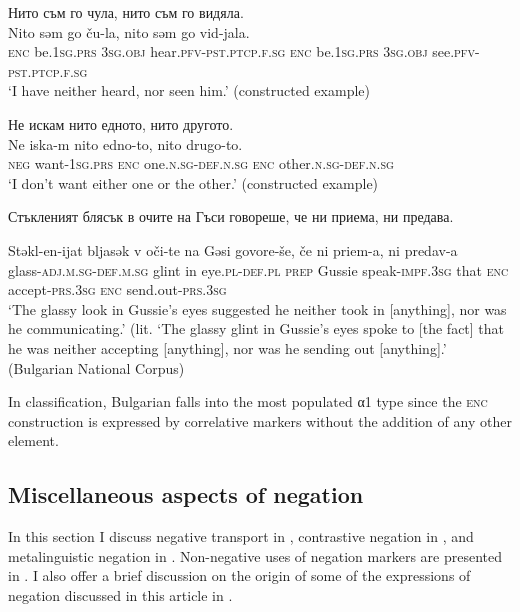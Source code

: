 \documentclass[output=paper,colorlinks=true, citecolor=brown]{langscibook}
\begin{document}

\ea \label{ex:bul:coord-1}
\ea Нито съм го чула, нито съм го видяла.\\ \label{ex:bul:coord-1a}
  	\gll Nito səm go ču-la, nito səm go vid-jala.\\
     \textsc{enc} be.\textsc{1sg.prs} \textsc{3sg.obj} hear.\textsc{pfv}-\textsc{pst.ptcp.f.sg} \textsc{enc} be.\textsc{1sg.prs} \textsc{3sg.obj} see.\textsc{pfv}-\textsc{pst.ptcp.f.sg}\\
\glt `I have neither heard, nor seen him.' (constructed example) 

\ex Не искам нито едното, нито другото. \\ \label{ex:bul:coord-1b} 
  	\gll Ne iska-m nito edno-to, nito drugo-to.\\
     \textsc{neg} want-\textsc{1sg.prs} \textsc{enc} one.\textsc{n.sg}-\textsc{def.n.sg} \textsc{enc} other.\textsc{n.sg}-\textsc{def.n.sg}\\
\glt `I don't want either one or the other.' (constructed example) 

\ex Стъкленият блясък в очите на Гъси говореше, че ни приема, ни предава.\\ \label{ex:bul:coord-1c}

\gll Stǝkl-en-ijat bljasǝk v oči-te na Gǝsi govore-še, če ni priem-a, ni predav-a\\
glass-\textsc{adj.m.sg}-\textsc{def.m.sg} glint in eye.\textsc{pl}-\textsc{def.pl} \textsc{prep} Gussie speak-\textsc{impf.3sg} that \textsc{enc} accept-\textsc{prs.3sg} \textsc{enc} send.out-\textsc{prs.3sg}\\
\glt `The glassy look in Gussie's eyes suggested he neither took in [anything], nor was he communicating.' (lit. `The glassy glint in Gussie's eyes spoke to [the fact] that he was neither accepting [anything], nor was he sending out [anything].' (Bulgarian National Corpus)
\z \z

In  classification, Bulgarian falls into the most populated α1 type since the \textsc{enc} construction is expressed by correlative markers without the addition of any other element. 

\subsection{Miscellaneous aspects of negation} \label{sec:bul:other_aspects}
In this section I discuss negative transport in , contrastive negation in , and metalinguistic negation in . Non-negative uses of negation markers are presented in . I also offer a brief discussion on the origin of some of the expressions of negation discussed in this article in .
\end{document}
